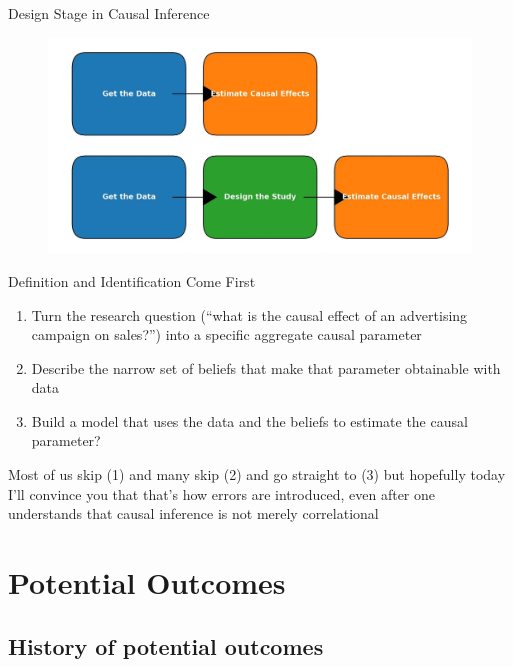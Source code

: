 \documentclass{beamer}
\begin{document}
\begin{frame}{Design Stage in Causal Inference}

\begin{figure}
    \centering
    \includegraphics[width=\textwidth]{./lecture_includes/design_stage.png}
\end{figure}

\end{frame}




\begin{frame}{Definition and Identification Come First}

\begin{enumerate}
\item Turn the research question (``what is the causal effect of an advertising campaign on sales?'') into a specific aggregate causal parameter
\item Describe the narrow set of beliefs that make that parameter obtainable with data
\item Build a model that uses the data and the beliefs to estimate the causal parameter?
\end{enumerate}

\bigskip

Most of us skip (1) and many skip (2) and go straight to (3) but hopefully today I'll convince you that that's how errors are introduced, even after one understands that causal inference is not merely correlational

\end{frame}

\section{Potential Outcomes}

\subsection{History of potential outcomes}
\end{document}
